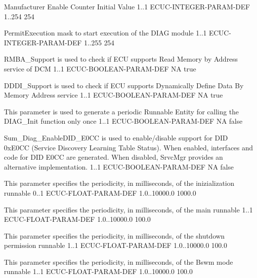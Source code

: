 {Manufacturer Enable Counter Initial Value}
{1..1}
{ECUC-INTEGER-PARAM-DEF}
{1..254}
{254}

{
{PermitExecution mask to start execution of the DIAG module}
{1..1}
{ECUC-INTEGER-PARAM-DEF}
{1..255}
{254}
}{}

{RMBA_Support is used to check if ECU supports Read Memory by Address service of DCM}
{1..1}
{ECUC-BOOLEAN-PARAM-DEF}
{NA}
{true}

{DDDI_Support is used to check if ECU supports Dynamically Define Data By Memory Address service}
{1..1}
{ECUC-BOOLEAN-PARAM-DEF}
{NA}
{true}

{
{This parameter is used to generate a periodic Runnable Entity for calling the DIAG_Init function only once}
{1..1}
{ECUC-BOOLEAN-PARAM-DEF}
{NA}
{false}
}{}

{
{Sum_Diag_EnableDID_E0CC is used to enable/disable support for DID 0xE0CC (Service Discovery Learning Table Status). When enabled, interfaces and code for DID E0CC are generated. When disabled, SrvcMgr provides an alternative implementation.}
{1..1}
{ECUC-BOOLEAN-PARAM-DEF}
{NA}
{false}
}
{ }

{
{This parameter specifies the periodicity, in milliseconds, of the inizialization runnable}
{0..1}
{ECUC-FLOAT-PARAM-DEF}
{1.0..10000.0}
{1000.0}
}{}

{
{This parameter specifies the periodicity, in milliseconds, of the main runnable}
{1..1}
{ECUC-FLOAT-PARAM-DEF}
{1.0..10000.0}
{100.0}
}{}

{
{This parameter specifies the periodicity, in milliseconds, of the shutdown permission runnable}
{1..1}
{ECUC-FLOAT-PARAM-DEF}
{1.0..10000.0}
{100.0}
}{}


{
{This parameter specifies the periodicity, in milliseconds, of the Bswm mode runnable}
{1..1}
{ECUC-FLOAT-PARAM-DEF}
{1.0..10000.0}
{100.0}
}{}


